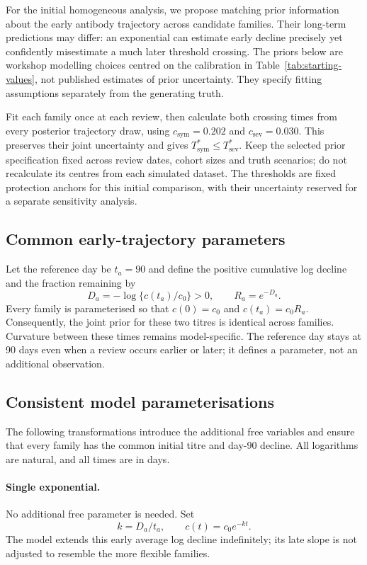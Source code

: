 \documentclass[11pt,a4paper]{article}
\begin{document}
For the initial homogeneous analysis, we propose matching prior information
about the early antibody trajectory across candidate families. Their
long-term predictions may differ: an exponential can estimate early decline
precisely yet confidently misestimate a much later threshold crossing. The
priors below are workshop modelling choices centred on the calibration in
Table~\ref{tab:starting-values}, not published estimates of prior uncertainty.
They specify fitting assumptions separately from the generating truth.

Fit each family once at each review, then calculate both crossing times from
every posterior trajectory draw, using $c_{\mathrm{sym}}=0.202$ and
$c_{\mathrm{sev}}=0.030$. This preserves their joint uncertainty and gives
$T^*_{\mathrm{sym}}\leq T^*_{\mathrm{sev}}$. Keep the selected prior
specification fixed across review dates, cohort sizes and truth scenarios;
do not recalculate its centres from each simulated dataset. The thresholds
are fixed protection anchors for this initial comparison, with their
uncertainty reserved for a separate sensitivity analysis.

\subsection*{Common early-trajectory parameters}

Let the reference day be $t_a=90$ and define the positive cumulative log
decline and the fraction remaining by
\begin{equation}
  D_a=-\log\{c(t_a)/c_0\}>0,\qquad R_a=e^{-D_a}.
  \label{eq:prior-anchor}
\end{equation}
Every family is parameterised so that $c(0)=c_0$ and $c(t_a)=c_0R_a$.
Consequently, the joint prior for these two titres is identical across
families. Curvature between these times remains model-specific. The
reference day stays at 90 days even when a review occurs earlier or later;
it defines a parameter, not an additional observation.

\subsection*{Consistent model parameterisations}

The following transformations introduce the additional free variables and
ensure that every family has the common initial titre and day-90 decline.
All logarithms are natural, and all times are in days.

\paragraph{Single exponential.}
No additional free parameter is needed. Set
\begin{equation}
  k=D_a/t_a,\qquad c(t)=c_0e^{-kt}.
  \label{eq:prior-exponential}
\end{equation}
The model extends this early average log decline indefinitely; its late
slope is not adjusted to resemble the more flexible families.
\end{document}
